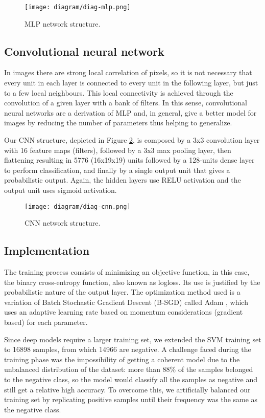         \begin{figure}
        \centering
        \texttt{[image: diagram/diag-mlp.png]}
        \caption{MLP network structure.}
        \label{fig:diag-mlp}
        \end{figure}

    \subsection{Convolutional neural network}
         In images there are strong local correlation of pixels, so it is not necessary that every unit in each layer is connected to every unit in the following layer, but just to a few local neighbours. This local connectivity is achieved through the convolution of a given layer with a bank of filters. In this sense, convolutional neural networks are a derivation of MLP and, in general, give a better model for images by reducing the number of parameters thus helping to generalize.

        Our CNN structure, depicted in Figure \ref{fig:diag-cnn}, is composed by a 3x3 convolution layer with 16 feature maps (filters), followed by a 3x3 max pooling layer, then flattening resulting in 5776 (16x19x19) units followed by a 128-units dense layer to perform classification, and finally by a single output unit that gives a probabilistic output. Again, the hidden layers use RELU activation and the output unit uses sigmoid activation.

        \begin{figure}
        \centering
        \texttt{[image: diagram/diag-cnn.png]}
        \caption{CNN network structure.}
        \label{fig:diag-cnn}
        \end{figure}

    \subsection{Implementation}
        The training process consists of minimizing an objective function, in this case, the binary cross-entropy function, also known as logloss. Its use is justified by the probabilistic nature of the output layer. The optimization method used is a variation of Batch Stochastic Gradient Descent (B-SGD) called Adam \cite{kingma2014adam}, which uses an adaptive learning rate based on momentum considerations (gradient based) for each parameter.

        Since deep models require a larger training set, we extended the SVM training set to 16898 samples, from which 14966 are negative. A challenge faced during the training phase was the impossibility of getting a coherent model due to the unbalanced distribution of the dataset: more than 88\% of the samples belonged to the negative class, so the model would classify all the samples as negative and still get a relative high accuracy. To overcome this, we artificially balanced our training set by replicating positive samples until their frequency was the same as the negative class.

